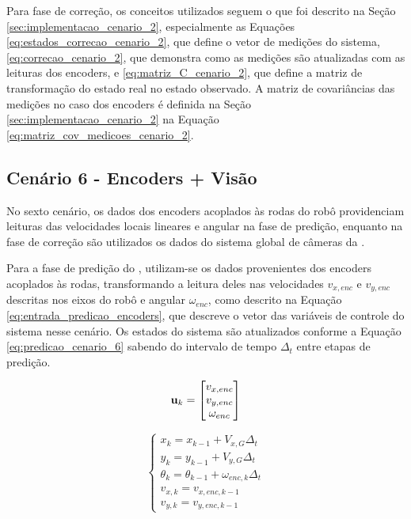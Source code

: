 \documentclass[acronym, symbols, table]{fei}
\begin{document}
			Para fase de correção, os conceitos utilizados seguem o que foi descrito na Seção \ref{sec:implementacao_cenario_2}, especialmente as Equações \eqref{eq:estados_correcao_cenario_2}, que define o vetor de medições do sistema, \eqref{eq:correcao_cenario_2}, que demonstra como as medições são atualizadas com as leituras dos encoders, e \eqref{eq:matriz_C_cenario_2}, que define a matriz de transformação do estado real no estado observado. A matriz de covariâncias das medições no caso dos encoders é definida na Seção \ref{sec:implementacao_cenario_2} na Equação \eqref{eq:matriz_cov_medicoes_cenario_2}.
			
		\subsection{Cenário 6 - Encoders + Visão} \label{sec:implementacao_cenario_6}
			
			No sexto cenário, os dados dos encoders acoplados às rodas do robô providenciam leituras das velocidades locais lineares e angular na fase de predição, enquanto na fase de correção são utilizados os dados do sistema global de câmeras da .
			
			Para a fase de predição do , utilizam-se os dados provenientes dos encoders acoplados às rodas, transformando a leitura deles nas velocidades $v_{x,enc}$ e $v_{y,enc}$ descritas nos eixos do robô e angular $\omega_{enc}$, como descrito na Equação \eqref{eq:entrada_predicao_encoders}, que descreve o vetor das variáveis de controle do sistema nesse cenário. Os estados do sistema são atualizados conforme a Equação \eqref{eq:predicao_cenario_6} sabendo do intervalo de tempo $\Delta_t$ entre etapas de predição.
			
			\begin{equation}\label{eq:entrada_predicao_encoders}
				\text{\textbf{u}}_k =
				\begin{bmatrix}
					v_{x,enc} \\
					v_{y,enc} \\
					\omega_{enc}
				\end{bmatrix}
			\end{equation}
		
			\begin{equation}\label{eq:predicao_cenario_6}
				\begin{cases}
					x_{k} = x_{k-1} + V_{x,G} \Delta_t \\
					y_{k} = y_{k-1} + V_{y,G} \Delta_t \\
					\theta_{k} = \theta_{k-1} + \omega_{enc,k} \Delta_t \\
					v_{x,k} = v_{x,enc,k-1} \\
					v_{y,k} = v_{y,enc,k-1}
				\end{cases}
			\end{equation}
			
\end{document}
